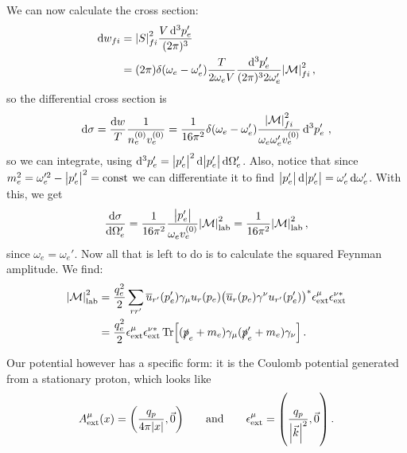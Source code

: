\documentclass[main.tex]{subfiles}
\begin{document}
We can now calculate the cross section: 
%
\begin{align}
\dd{w_{fi}} &= \abs{S}_{fi}^2  \frac{V \dd[3]{p_e'}}{(2 \pi )^3}  \\
&= ( 2\pi ) \delta(\omega_{e} - \omega_{e}') \frac{T}{2 \omega_{e}V} 
\frac{ \dd[3]{p_e'}}{(2 \pi )^3 2 \omega_e'} \abs{\mathcal{M}}^2_{fi}
\,,
\end{align}
%
so the differential cross section is 
%
\begin{align}
\dd{\sigma } = \frac{ \dd{w}}{T}
\frac{1}{n_e^{(0)} v_e^{(0)}}
= \frac{1}{16 \pi^2} \delta(\omega_{e} - \omega_{e}')
\frac{\abs{\mathcal{M}}^2_{fi}}{\omega_{e} \omega_{e}' v_e^{(0)}} \dd[3]{p_e'}
\,,
\end{align}
%
so we can integrate, using \(\dd[3]{p_e'} = \abs{p_e'}^2 \dd{\abs{p_e'}} \dd{\Omega_{e}'}\). Also, notice that since \(m_e^2= \omega_{e}^{\prime 2} - \abs{p_e'}^2 = \text{const}\) we can differentiate it to find \(\abs{p_e'} \dd{\abs{p_e'}} = \omega_{e}' \dd{\omega_{e}'}\). With this, we get 
%
\begin{align}
\dv{\sigma }{\Omega'_e} = \frac{1}{16 \pi^2} \frac{\abs{p_e'}}{\omega_{e} v_e^{(0)}}
\abs{\mathcal{M}}^2 _{\text{lab}} 
= \frac{1}{16 \pi^2}
\abs{\mathcal{M}}^2 _{\text{lab}} 
\,,
\end{align}
%
since \(\omega_{e} = \omega_{e}'\). 
Now all that is left to do is to calculate the squared Feynman amplitude.
We find: 
%
\begin{align}
\abs{\mathcal{M}}^2 _{\text{lab}} &= \frac{q_e^2}{2}
\sum _{rr'} 
\overline{u}_{r'} (p_e') \gamma_{\mu } u_r (p_e)
\qty(\overline{u}_{r} (p_e) \gamma^{\nu} u_{r'} (p_e'))^{*}
\epsilon^{\mu } _{\text{ext}} \epsilon^{\nu *} _{\text{ext}}   \\
&= \frac{q_e^2}{2}  \epsilon^{\mu } _{\text{ext}} \epsilon^{\nu *} _{\text{ext}} 
\Tr[(\slashed{p}_e + m_e) \gamma_{\mu } (\slashed{p}_e' + m_e) \gamma_{\nu }]
\,.
\end{align}


Our potential however has a specific form: it is the Coulomb potential generated from a stationary proton, which looks like 
%
\begin{align}
A^{\mu } _{\text{ext}} (x) = \qty( \frac{q_p}{4 \pi \abs{x}}, \vec{0})
\qquad \text{and} \qquad
\epsilon^{\mu } _{\text{ext}} = \qty( \frac{q_p}{\abs{\vec{k}}^2}, \vec{0})
\,.
\end{align}
\end{document}
